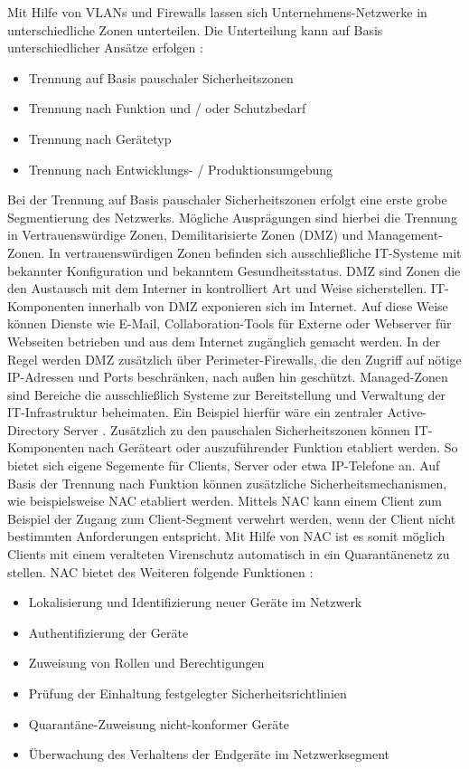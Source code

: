 \bigbreak
Mit Hilfe von VLANs und Firewalls lassen sich Unternehmens-Netzwerke in unterschiedliche Zonen unterteilen. Die Unterteilung kann auf Basis unterschiedlicher Ansätze erfolgen \autocite{the_bristol_group_deutschland_gmbh_2021}:
\begin{itemize}
    \item Trennung auf Basis pauschaler Sicherheitszonen
    \item Trennung nach Funktion und / oder Schutzbedarf
    \item Trennung nach Gerätetyp 
    \item Trennung nach Entwicklungs- / Produktionsumgebung
\end{itemize}
\bigbreak
Bei der Trennung auf Basis pauschaler Sicherheitszonen erfolgt eine erste grobe Segmentierung des Netzwerks. Mögliche Ausprägungen sind hierbei die Trennung in \glqq{}Vertrauenswürdige Zonen\grqq{}, \glqq{}Demilitarisierte Zonen (DMZ)\grqq{} und \glqq{}Management-Zonen\grqq{}. In vertrauenswürdigen Zonen befinden sich ausschließliche IT-Systeme mit bekannter Konfiguration und bekanntem Gesundheitsstatus. DMZ sind Zonen die den Austausch mit dem Interner in kontrolliert Art und Weise sicherstellen. IT-Komponenten innerhalb von DMZ exponieren sich im Internet. Auf diese Weise können Dienste wie E-Mail, Collaboration-Tools für Externe oder Webserver für Webseiten betrieben und aus dem Internet zugänglich gemacht werden. In der Regel werden DMZ zusätzlich über Perimeter-Firewalls, die den Zugriff auf nötige IP-Adressen und Ports beschränken, nach außen hin geschützt. Managed-Zonen sind Bereiche die ausschließlich Systeme zur Bereitstellung und Verwaltung der IT-Infrastruktur beheimaten. Ein Beispiel hierfür wäre ein zentraler Active-Directory Server \autocite{iainfoulds}. 
\bigbreak
Zusätzlich zu den pauschalen Sicherheitszonen können IT-Komponenten nach Geräteart oder auszuführender Funktion etabliert werden. So bietet sich eigene Segemente für Clients, Server oder etwa IP-Telefone an. Auf Basis der Trennung nach Funktion können zusätzliche Sicherheitsmechanismen, wie beispielsweise NAC etabliert werden. Mittels NAC kann einem Client zum Beispiel der Zugang zum Client-Segment verwehrt werden, wenn der Client nicht bestimmten Anforderungen entspricht. Mit Hilfe von NAC ist es somit möglich Clients mit einem veralteten Virenschutz automatisch in ein Quarantänenetz zu stellen. 
\bigbreak
NAC bietet des Weiteren folgende Funktionen \autocite{sandata_2022}:
\begin{itemize}
    \item Lokalisierung und Identifizierung neuer Geräte im Netzwerk
    \item Authentifizierung der Geräte 
    \item Zuweisung von Rollen und Berechtigungen
    \item Prüfung der Einhaltung festgelegter Sicherheitsrichtlinien
    \item Quarantäne-Zuweisung nicht-konformer Geräte
    \item Überwachung des Verhaltens der Endgeräte im Netzwerksegment
\end{itemize}

